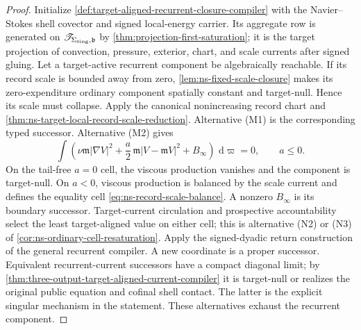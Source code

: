 \documentclass[11pt]{article}
\numberwithin{section}{part}
\theoremstyle{plain}
\theoremstyle{definition}
\theoremstyle{remark}
\newcommand{\dd}{\,\mathrm d}
\newcommand{\Spine}{\mathscr T}
\begin{document}
\begin{proof}
Initialize \cref{def:target-aligned-recurrent-closure-compiler} with the
Navier--Stokes shell covector and signed local-energy carrier.  Its aggregate
row is generated on \(\Spine_{\Sigma_{\rm sing},\mathfrak b}\) by
\cref{thm:projection-first-saturation}; it is the target projection of
convection, pressure, exterior, chart, and scale currents after signed
gluing.  Let a target-active recurrent component
be algebraically reachable.  If its record scale is bounded
away from zero, \cref{lem:ns-fixed-scale-closure} makes its zero-expenditure
ordinary component spatially constant and target-null.  Hence its scale must
collapse.  Apply the canonical nonincreasing record chart and
\cref{thm:ns-target-local-record-scale-reduction}.  Alternative
\textup{(M1)} is the corresponding typed successor.
Alternative \textup{(M2)} gives
\[
 \int\left(\nu\mathfrak m|\nabla V|^2+\frac a2\,
       \mathfrak m|V-\mathfrak mV|^2+B_\infty\right)\,\dd\varpi=0,
 \qquad a\le0.
\]
On the tail-free \(a=0\) cell, the viscous production vanishes and the
component is target-null.  On \(a<0\), viscous production is balanced by the
scale current and defines the equality cell
\eqref{eq:ns-record-scale-balance}.  A nonzero \(B_\infty\) is its boundary
successor.  Target-current circulation and prospective accountability select
the least target-aligned value on either cell; this is alternative
\textup{(N2)} or \textup{(N3)} of
\cref{cor:ns-ordinary-cell-resaturation}.  Apply the signed-dyadic return
construction of the general recurrent compiler.  A new
coordinate is a proper successor.  Equivalent recurrent-current successors
have a compact diagonal limit; by
\cref{thm:three-output-target-aligned-current-compiler} it is target-null or
realizes the original public equation and cofinal shell contact.  The latter
is the explicit singular mechanism in the statement.  These alternatives
exhaust the recurrent component.
\end{proof}
\end{document}
